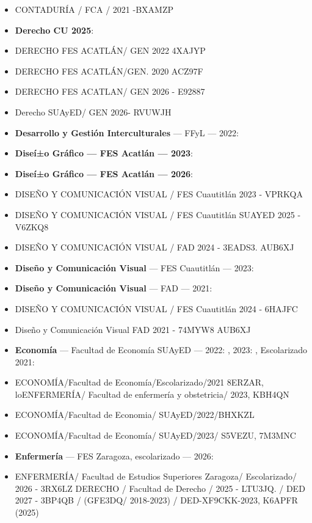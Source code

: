 \begin{itemize}[leftmargin=*]
  \item CONTADURÍA / FCA / 2021 -BXAMZP
  \item \textbf{Derecho CU 2025}: 
  \item DERECHO FES ACATLÁN/ GEN 2022 4XAJYP
  \item DERECHO FES ACATLÁN/GEN. 2020 ACZ97F
  \item DERECHO FES ACATLAN/ GEN 2026 - E92887
  \item Derecho SUAyED/ GEN 2026- RVUWJH
  \item \textbf{Desarrollo y Gestión Interculturales} --- FFyL --- 2022: 
  \item \textbf{Diseí±o Gráfico --- FES Acatlán --- 2023}: 
  \item \textbf{Diseí±o Gráfico --- FES Acatlán --- 2026}: 
  \item DISEÑO Y COMUNICACIÓN VISUAL / FES Cuautitlán 2023 - VPRKQA
  \item DISEÑO Y COMUNICACIÓN VISUAL / FES Cuautitlán SUAYED 2025 - V6ZKQ8
  \item DISEÑO Y COMUNICACIÓN VISUAL / FAD 2024 - 3EADS3. AUB6XJ
  \item \textbf{Diseño y Comunicación Visual} --- FES Cuautitlán --- 2023: 
  \item \textbf{Diseño y Comunicación Visual} --- FAD --- 2021: 
  \item DISEÑO Y COMUNICACIÓN VISUAL / FES Cuautitlán 2024 - 6HAJFC
  \item Diseño y Comunicación Visual FAD 2021 - 74MYW8 AUB6XJ
  \item \textbf{Economía} --- Facultad de Economía SUAyED --- 2022: , 2023: , Escolarizado 2021: 
  \item ECONOMÍA/Facultad de Economía/Escolarizado/2021 8ERZAR, loENFERMERÍA/ Facultad de enfermería y obstetricia/ 2023, KBH4QN
  \item ECONOMÍA/Facultad de Economia/ SUAyED/2022/BHXKZL
  \item ECONOMÍA/Facultad de Economía/ SUAyED/2023/ S5VEZU, 7M3MNC
  \item \textbf{Enfermería} --- FES Zaragoza, escolarizado --- 2026: 
  \item ENFERMERÍA/ Facultad de Estudios Superiores Zaragoza/ Escolarizado/ 2026 - 3RX6LZ DERECHO / Facultad de Derecho / 2025 - LTU3JQ. / DED 2027 - 3BP4QB / (GFE3DQ/ 2018-2023) / DED-XF9CKK-2023, K6APFR (2025)

\end{itemize}
